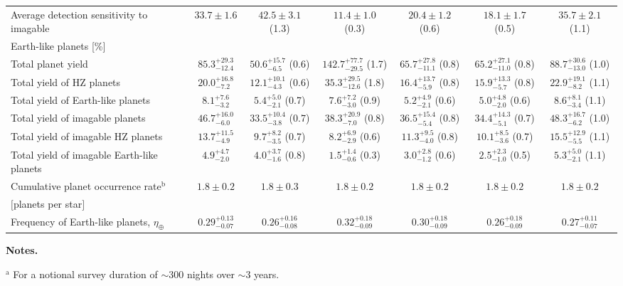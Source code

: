\begin{landscape}
\begin{table*}
\begin{tabular}{lcccccc}
     Average detection sensitivity to imagable & $33.7 \pm 1.6$ & $42.5 \pm 3.1$ (1.3) & $11.4 \pm 1.0$ (0.3) & $20.4 \pm 1.2$ (0.6) & $18.1 \pm 1.7$ (0.5) & $35.7 \pm 2.1$ (1.1) \\
     Earth-like planets [\%] &&&&&& \\
     \hline
     Total planet yield & $85.3^{+29.3}_{-12.4}$ & $50.6^{+15.7}_{-6.5}$ (0.6) & $142.7^{+77.7}_{-29.5}$ (1.7) & $65.7^{+27.8}_{-11.1}$ (0.8) & $65.2^{+27.1}_{-11.0}$ (0.8) & $88.7^{+30.6}_{-13.0}$ (1.0) \\
     Total yield of HZ planets & $20.0^{+16.8}_{-7.2}$ & $12.1^{+10.1}_{-4.3}$ (0.6) & $35.3^{+29.5}_{-12.6}$ (1.8) & $16.4^{+13.7}_{-5.9}$ (0.8) & $15.9^{+13.3}_{-5.7}$ (0.8) & $22.9^{+19.1}_{-8.2}$ (1.1) \\
     Total yield of Earth-like planets & $8.1^{+7.6}_{-3.2}$ & $5.4^{+5.0}_{-2.1}$ (0.7) & $7.6^{+7.2}_{-3.0}$ (0.9) & $5.2^{+4.9}_{-2.1}$ (0.6) & $5.0^{+4.8}_{-2.0}$ (0.6) & $8.6^{+8.1}_{-3.4}$ (1.1) \\
     Total yield of imagable planets & $46.7^{+16.0}_{-6.0}$ & $33.5^{+10.4}_{-3.8}$ (0.7) & $38.3^{+20.9}_{-7.0}$ (0.8) & $36.5^{+15.4}_{-5.4}$ (0.8) & $34.4^{+14.3}_{-5.1}$ (0.7) & $48.3^{+16.7}_{-6.2}$ (1.0) \\
     Total yield of imagable HZ planets & $13.7^{+11.5}_{-4.9}$ & $9.7^{+8.2}_{-3.5}$ (0.7) & $8.2^{+6.9}_{-2.9}$ (0.6) & $11.3^{+9.5}_{-4.0}$ (0.8) & $10.1^{+8.5}_{-3.6}$ (0.7) & $15.5^{+12.9}_{-5.5}$ (1.1) \\
     Total yield of imagable Earth-like planets & $4.9^{+4.7}_{-2.0}$ & $4.0^{+3.7}_{-1.6}$ (0.8) & $1.5^{+1.4}_{-0.6}$ (0.3) & $3.0^{+2.8}_{-1.2}$ (0.6) & $2.5^{+2.3}_{-1.0}$ (0.5) & $5.3^{+5.0}_{-2.1}$ (1.1) \\
     \hline
     Cumulative planet occurrence rate$^{\text{b}}$ & $1.8 \pm 0.2$ & $1.8 \pm 0.3$ & $1.8 \pm 0.2$ & $1.8 \pm 0.2$ & $1.8 \pm 0.2$ & $1.8 \pm 0.2$ \\
     $[$planets per star$]$ &&&&&& \\
     Frequency of Earth-like planets, $\eta_{\oplus}$ & $0.29^{+0.13}_{-0.07}$ & $0.26^{+0.16}_{-0.08}$ & $0.32^{+0.18}_{-0.09}$ & $0.30^{+0.18}_{-0.09}$ & $0.26^{+0.18}_{-0.09}$ & $0.27^{+0.11}_{-0.07}$
     \end{tabular}
     \begin{list}{}{}
     \item {\bf{Notes.}}
     \item $^{\text{a}}$ For a notional survey duration of $\sim 300$ nights over $\sim 3$ years.

\end{list}
\end{table*}
\end{landscape}
